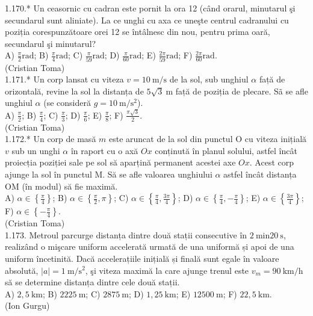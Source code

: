 1.170.* Un ceasornic cu cadran este pornit la ora 12 (când orarul, minutarul şi secundarul sunt aliniate). La ce unghi cu axa ce uneşte centrul cadranului cu poziția corespunzătoare orei 12 se întâlnesc din nou, pentru prima oară, secundarul şi minutarul?\\ A) $\frac{\pi}{2} \mathrm{rad}$; B) $\frac{\pi}{4} \mathrm{rad}$; C) $\frac{\pi}{59} \mathrm{rad}$; D) $\frac{\pi}{60} \mathrm{rad}$; E) $\frac{2 \pi}{59} \mathrm{rad}$; F) $\frac{2 \pi}{60} \mathrm{rad}$.\\ (Cristian Toma)\\

1.171.* Un corp lansat cu viteza $v=10 \mathrm{~m} / \mathrm{s}$ de la sol, sub unghiul $\alpha$ față de orizontală, revine la sol la distanța de $5 \sqrt{3} \mathrm{~m}$ față de poziția de plecare. Sã se afle unghiul $\alpha$ (se consideră $g=10 \mathrm{~m} / \mathrm{s}^{2}$).\\ A) $\frac{\pi}{2}$; B) $\frac{\pi}{4}$; C) $\frac{\pi}{3}$; D) $\frac{\pi}{6}$; E) $\frac{\pi}{8}$; F) $\frac{\pi \sqrt{3}}{2}$.\\ (Cristian Toma)\\

1.172.* Un corp de masă $m$ este aruncat de la sol din punctul O cu viteza inițială $v$ sub un unghi $\alpha$ în raport cu o axă $Ox$ conținută în planul solului, astfel încât proiecția poziției sale pe sol să aparțină permanent acestei axe $Ox$. Acest corp ajunge la sol în punctul M. Să se afle valoarea unghiului $\alpha$ astfel încât distanța OM (în modul) să fie maximă.\\ A) $\alpha \in\left\{\frac{\pi}{4}\right\}$; B) $\alpha \in\left\{\frac{\pi}{2}, \pi\right\}$; C) $\alpha \in\left\{\frac{\pi}{4}, \frac{3 \pi}{4}\right\}$; D) $\alpha \in\left\{\frac{\pi}{4},-\frac{\pi}{4}\right\}$; E) $\alpha \in\left\{\frac{3 \pi}{4}\right\}$; F) $\alpha \in\left\{-\frac{\pi}{4}\right\}$.\\ (Cristian Toma)\\

1.173. Metroul parcurge distanța dintre două stații consecutive în $2 \mathrm{~min} 20 \mathrm{~s}$, realizând o mişcare uniform accelerată urmată de una uniformă și apoi de una uniform încetinită. Dacă accelerațiile inițială și finală sunt egale în valoare absolută, $|a|=1 \mathrm{~m} / \mathrm{s}^{2}$, şi viteza maximă la care ajunge trenul este $v_{m}=90 \mathrm{~km} / \mathrm{h}$ să se determine distanța dintre cele două stații.\\ A) $2,5 \mathrm{~km}$; B) $2225 \mathrm{~m}$; C) $2875 \mathrm{~m}$; D) $1,25 \mathrm{~km}$; E) $12500 \mathrm{~m}$; F) $22,5 \mathrm{~km}$.\\ (Ion Gurgu)\\

